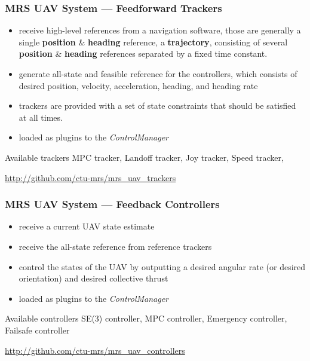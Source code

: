 \documentclass[aspectratio=1610]{beamer}
\begin{document}
  \begin{frame}
    \frametitle{MRS UAV System --- Feedforward Trackers}

    \begin{itemize}
      \item receive high-level references from a navigation software, those are generally
        a single \textbf{position} \& \textbf{heading} reference,
        a \textbf{trajectory}, consisting of several \textbf{position} \& \textbf{heading} references separated by a fixed time constant.
      \item generate all-state and feasible reference for the controllers, which consists of
        desired position, velocity, acceleration, heading, and heading rate
      \item trackers are provided with a set of state constraints that should be satisfied at all times.
      \item loaded as plugins to the \emph{ControlManager}
    \end{itemize}

    \begin{block}{Available trackers}
      MPC tracker, Landoff tracker, Joy tracker, Speed tracker, \hdots
    \end{block}

    \begin{block}{\cite{baca2020mrs}}
      \url{http://github.com/ctu-mrs/mrs_uav_trackers}
    \end{block}

  \end{frame}



  \begin{frame}
    \frametitle{MRS UAV System --- Feedback Controllers}

    \begin{itemize}
      \item receive a current UAV state estimate
      \item receive the all-state reference from reference trackers
      \item control the states of the UAV by outputting a desired angular rate (or desired orientation) and desired collective thrust
      \item loaded as plugins to the \emph{ControlManager}
    \end{itemize}

    \begin{block}{Available controllers}
      SE(3) controller, MPC controller, Emergency controller, Failsafe controller
    \end{block}

    \begin{block}{\cite{baca2020mrs}}
      \url{http://github.com/ctu-mrs/mrs_uav_controllers}
    \end{block}

  \end{frame}
\end{document}
